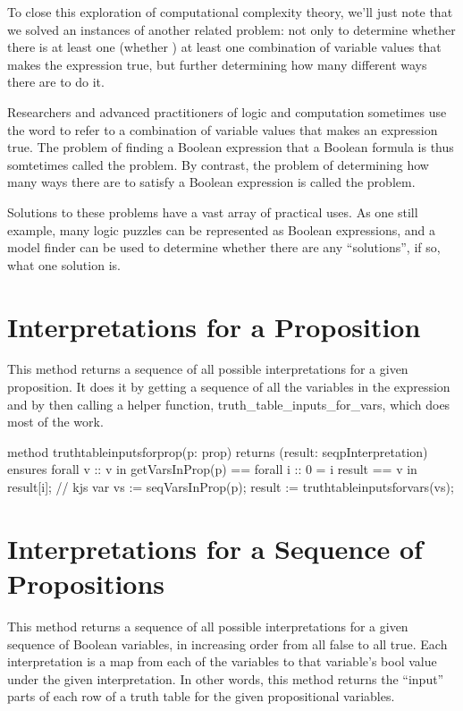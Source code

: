 \documentclass[letterpaper,10pt,english]{sphinxmanual}
\begin{document}
To close this exploration of computational complexity theory, we’ll
just note that we solved an instances of another related problem: not
only to determine whether there is at least one (whether ) at least one combination of variable values that makes the
expression true, but further determining how many different ways there
are to do it.

Researchers and advanced practitioners of logic and computation
sometimes use the word  to refer to a combination of variable
values that makes an expression true. The problem of finding a Boolean
expression that  a Boolean formula is thus somtetimes
called the  problem. By contrast, the problem of
determining how many ways there are to satisfy a Boolean expression is
called the  problem.

Solutions to these problems have a vast array of practical uses.  As
one still example, many logic puzzles can be represented as Boolean
expressions, and a model finder can be used to determine whether there
are any “solutions”, if so, what one solution is.


\section{Interpretations for a Proposition}
\label{\detokenize{12-satisfiability:interpretations-for-a-proposition}}
This method returns a sequence of all possible interpretations for a
given proposition. It does it by getting a sequence of all the
variables in the expression and by then calling a helper function,
truth\_table\_inputs\_for\_vars, which does most of the work.

\begin{sphinxVerbatim}[commandchars=\\\{\}]
method truth\PYGZus{}table\PYGZus{}inputs\PYGZus{}for\PYGZus{}prop(p: prop)
    returns (result: seq\PYGZlt{}pInterpretation\PYGZgt{})
    ensures forall v :: v in getVarsInProp(p) ==\PYGZgt{}
                forall i :: 0 \PYGZlt{}= i \PYGZlt{} \textbar{}result\textbar{} ==\PYGZgt{}
                    v in result[i];     // kjs
\PYGZob{}
    var vs := seqVarsInProp(p);
    result := truth\PYGZus{}table\PYGZus{}inputs\PYGZus{}for\PYGZus{}vars(vs);
\PYGZcb{}
\end{sphinxVerbatim}


\section{Interpretations for a Sequence of Propositions}
\label{\detokenize{12-satisfiability:interpretations-for-a-sequence-of-propositions}}
This method returns a sequence of all possible interpretations for a
given sequence of Boolean variables, in increasing order from all
false to all true. Each interpretation is a map from each of the
variables to that variable’s bool value under the given
interpretation. In other words, this method returns the “input” parts
of each row of a truth table for the given propositional variables.
\end{document}
